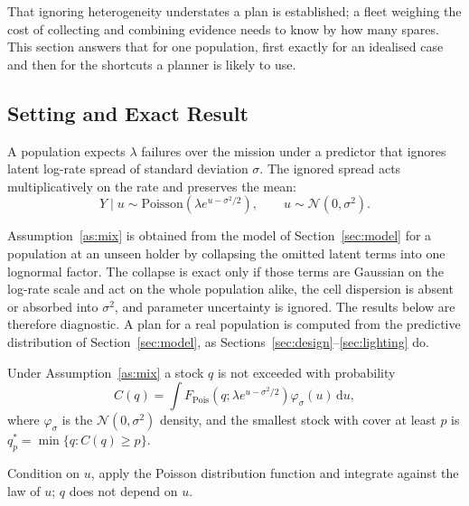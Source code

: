 That ignoring heterogeneity understates a plan is established; a fleet weighing
the cost of collecting and combining evidence needs to know by how many spares.
This section answers that for one population, first exactly for an idealised
case and then for the shortcuts a planner is likely to use.

\subsection{Setting and Exact Result}
\begin{assumption}
\label{as:mix}
A population expects $\lambda$ failures over the mission under a predictor that
ignores latent log-rate spread of standard deviation $\sigma$. The ignored
spread acts multiplicatively on the rate and preserves the mean:
\begin{equation}
Y\mid u\sim\mathrm{Poisson}\!\left(\lambda e^{u-\sigma^2/2}\right),\qquad
u\sim\mathcal N(0,\sigma^2).
\label{eq:mixture}
\end{equation}
\end{assumption}

Assumption~\ref{as:mix} is obtained from the model of Section~\ref{sec:model}
for a population at an unseen holder by collapsing the omitted latent terms into
one lognormal factor. The collapse is exact only if those terms are Gaussian on
the log-rate scale and act on the whole population alike, the cell dispersion
is absent or absorbed into $\sigma^2$, and parameter uncertainty is ignored.
The results below are therefore diagnostic. A plan for a real population is
computed from the predictive distribution of Section~\ref{sec:model}, as
Sections~\ref{sec:design}--\ref{sec:lighting} do.

\begin{proposition}
\label{prop:exact}
Under Assumption~\ref{as:mix} a stock $q$ is not exceeded with probability
\begin{equation}
C(q)=\int F_{\mathrm{Pois}}\!\left(q;\lambda e^{u-\sigma^2/2}\right)
\varphi_\sigma(u)\,\mathrm du ,
\label{eq:cover}
\end{equation}
where $\varphi_\sigma$ is the $\mathcal N(0,\sigma^2)$ density, and the smallest
stock with cover at least $p$ is $q^\ast_p=\min\{q:C(q)\ge p\}$.
\end{proposition}
\begin{IEEEproof}
Condition on $u$, apply the Poisson distribution function and integrate
against the law of $u$; $q$ does not depend on $u$.
\end{IEEEproof}

